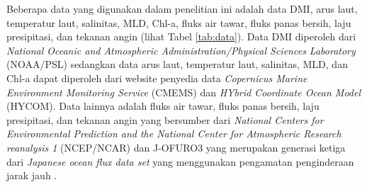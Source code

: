\begin{spacing}{1.5}
	Beberapa data yang digunakan dalam penelitian ini adalah data DMI, arus laut, temperatur laut, salinitas, MLD, Chl-a, fluks air tawar, fluks panas bersih, laju presipitasi, dan tekanan angin (lihat Tabel \ref*{tab:data}). Data DMI diperoleh dari \textit{National Oceanic and Atmospheric Administration/Physical Sciences Laboratory} (NOAA/PSL) \cite{Saji2003} sedangkan data arus laut, temperatur laut, salinitas, MLD, dan Chl-a dapat diperoleh dari website penyedia data \textit{Copernicus Marine Environment Monitoring Service} (CMEMS)\cite{Lellouche2018} dan \textit{HYbrid Coordinate Ocean Model} (HYCOM)\cite{Chassignet2007}. Data lainnya adalah fluks air tawar, fluks panas bersih, laju presipitasi, dan tekanan angin yang bersumber dari \textit{National Centers for Environmental Prediction and the National Center for Atmospheric Research reanalysis 1} (NCEP/NCAR) \cite{Kalnay1996} dan J-OFURO3 yang merupakan generasi ketiga dari \textit{Japanese ocean flux data set} yang menggunakan pengamatan penginderaan jarak jauh \cite{Tomita2019}. 
	
	

\end{spacing}
